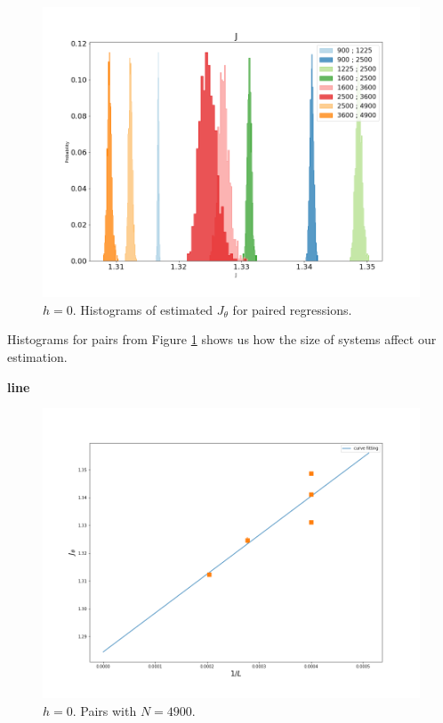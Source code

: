  \begin{figure}
	\centering
	\includegraphics[scale=0.28]{Images/radius_hist_cov.png}
	\caption{$h=0$. Histograms of estimated $J_{\theta}$ for paired regressions.  }
	\label{fig:Jthetahistogram}
\end{figure}

Histograms for pairs from Figure \ref{fig:Jthetahistogram} shows us how the size of systems affect our estimation. 

\textbf{line}

 \begin{figure}
	\centering
	\includegraphics[scale=0.28]{Images/criticalr2.png}
	\caption{$h=0$. Pairs with $N=4900$.  }
	\label{fig:JthetaLinear}
\end{figure}

